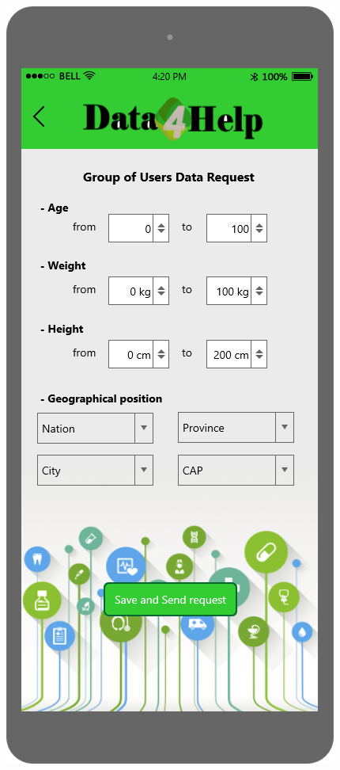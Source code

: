 \begin{figure}[h!]
	\centering
 	\begin{minipage}[b]{0.25\textwidth}
    		\includegraphics[width=\textwidth]{./pictures/group_request.png}

\end{minipage}
\end{figure}
